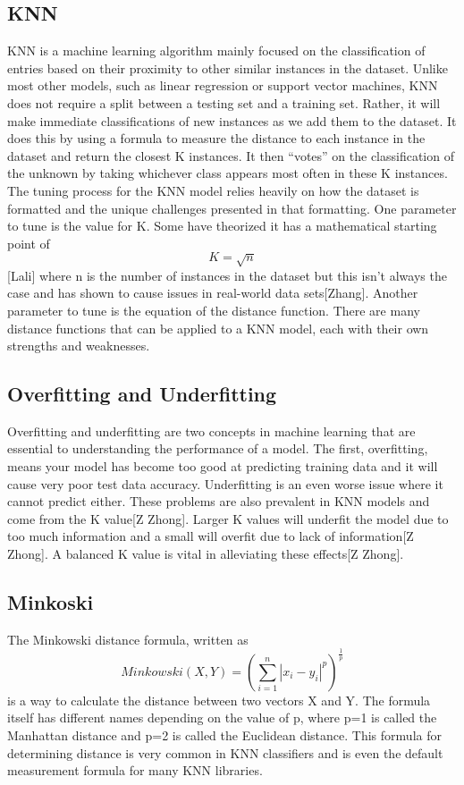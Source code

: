 \documentclass[confrence]{IEEEtran}
\begin{document}
\subsection*{KNN}
KNN is a machine learning algorithm mainly focused on the classification of entries based on their proximity to other similar instances in the dataset.
Unlike most other models, such as linear regression or support vector machines, KNN does not require a split between a testing set and a training set.
Rather, it will make immediate classifications of new instances as we add them to the dataset.
It does this by using a formula to measure the distance to each instance in the dataset and return the closest K instances. It then “votes” on the classification of the unknown by taking whichever class appears most often in these K instances.
The tuning process for the KNN model relies heavily on how the dataset is formatted and the unique challenges presented in that formatting.
One parameter to tune is the value for K.
Some have theorized it has a mathematical starting point of \[K = \sqrt{n}\][Lali] where n is the number of instances in the dataset but this isn't always the case and has shown to cause issues in real-world data sets[Zhang].
Another parameter to tune is the equation of the distance function.
There are many distance functions that can be applied to a KNN model, each with their own strengths and weaknesses.
\subsection*{Overfitting and Underfitting}
Overfitting and underfitting are two concepts in machine learning that are essential to understanding the performance of a model. 
The first, overfitting, means your model has become too good at predicting training data and it will cause very poor test data accuracy. 
Underfitting is an even worse issue where it cannot predict either. These problems are also prevalent in KNN models and come from the K value[Z Zhong]. 
Larger K values will underfit the model due to too much information and a small will overfit due to lack of information[Z Zhong]. 
A balanced K value is vital in alleviating these effects[Z Zhong].
\subsection*{Minkoski}
The Minkowski distance formula, written as \[ Minkowski(X,Y) = (\sum_{i=1}^n|x_i-y_i|^p)^\frac{1}{p}\] is a way to calculate the distance between two vectors X and Y. 
The formula itself has different names depending on the value of p, where p=1 is called the Manhattan distance and p=2 is called the Euclidean distance. 
This formula for determining distance is very common in KNN classifiers and is even the default measurement formula for many KNN libraries. 
\end{document}
